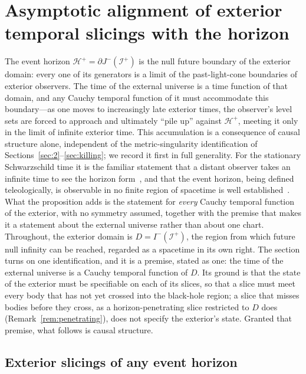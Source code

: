 \documentclass[11pt,a4paper]{article}
\theoremstyle{plain}
\theoremstyle{remark}
\begin{document}
\section{Asymptotic alignment of exterior temporal slicings with the horizon}\label{sec:alignment}
The event horizon $\mathcal{H}^+=\partial J^-(\mathscr{I}^+)$ is the null future boundary of the exterior domain: every one of its generators is a limit of the past-light-cone boundaries of exterior observers. The time of the external universe is a time function of that domain, and any Cauchy temporal function of it must accommodate this boundary---as one moves to increasingly late exterior times, the observer's level sets are forced to approach and ultimately ``pile up'' against $\mathcal{H}^+$, meeting it only in the limit of infinite exterior time. This accumulation is a consequence of causal structure alone, independent of the metric-singularity identification of Sections~\ref{sec:2}--\ref{sec:killing}; we record it first in full generality. For the stationary Schwarzschild time it is the familiar statement that a distant observer takes an infinite time to see the horizon form~\cite{Baccetti2017}, and that the event horizon, being defined teleologically, is observable in no finite region of spacetime is well established~\cite{Visser2014}. What the proposition adds is the statement for \emph{every} Cauchy temporal function of the exterior, with no symmetry assumed, together with the premise that makes it a statement about the external universe rather than about one chart. Throughout, the exterior domain is $D=I^-(\mathscr{I}^+)$, the region from which future null infinity can be reached, regarded as a spacetime in its own right. The section turns on one identification, and it is a premise, stated as one: the time of the external universe is a Cauchy temporal function of $D$. Its ground is that the state of the exterior must be specifiable on each of its slices, so that a slice must meet every body that has not yet crossed into the black-hole region; a slice that misses bodies before they cross, as a horizon-penetrating slice restricted to $D$ does (Remark~\ref{rem:penetrating}), does not specify the exterior's state. Granted that premise, what follows is causal structure.

\subsection{Exterior slicings of any event horizon}\label{sec:anyhorizon}
\end{document}
